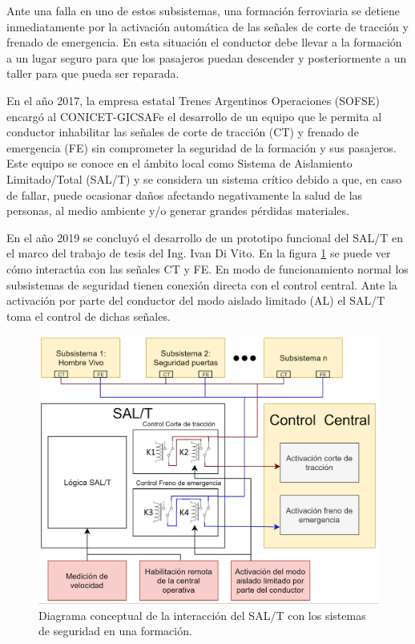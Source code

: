 \documentclass[11pt]{charter}
\begin{document}
Ante una falla en uno de estos subsistemas, una formación ferroviaria se detiene inmediatamente por la activación 
automática de las señales de corte de tracción y frenado de emergencia. En esta situación el conductor debe llevar a la 
formación a un lugar seguro para que los pasajeros puedan descender y posteriormente a un taller para que pueda ser 
reparada.

En el año 2017, la empresa estatal Trenes Argentinos Operaciones (SOFSE) encargó al CONICET-GICSAFe el desarrollo de un 
equipo que le permita al conductor inhabilitar las señales de corte de tracción (CT) y frenado de emergencia (FE) sin comprometer 
la seguridad de la formación y sus pasajeros. Este equipo se conoce en el ámbito local como Sistema de Aislamiento 
Limitado/Total (SAL/T) y se considera un sistema crítico debido a que, en caso de fallar, puede 
ocasionar daños afectando negativamente la salud de las personas, al medio ambiente y/o generar grandes pérdidas 
materiales.

En el año 2019 se concluyó el desarrollo de un prototipo funcional del SAL/T  en el marco del trabajo de tesis del Ing. 
Ivan Di Vito. En la figura \ref{fig:diagrama_de_bloques} se puede ver cómo interactúa con las señales CT y FE. En modo 
de funcionamiento normal los subsistemas de seguridad tienen conexión directa con el control central. Ante la activación 
por parte del conductor del modo aislado limitado (AL) el SAL/T toma el control de dichas señales.

\begin{figure}[htpb]
\centering 
\includegraphics[width=.85\textwidth]{./Figuras/diagrama_de_bloques.png}
\caption{Diagrama conceptual de la interacción del SAL/T con los sistemas de seguridad en una formación.}
\label{fig:diagrama_de_bloques}
\end{figure}
\end{document}

